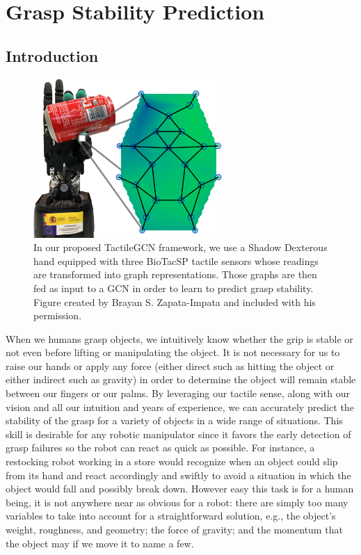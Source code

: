 \chapter{Grasp Stability Prediction}
\label{cha:tactile}

\begin{chapterabstract}
    \lipsum[2]
\end{chapterabstract}

\clearpage

\section{Introduction}
\label{cha:tactile:sec:introduction}

\begin{figure}[!b]
	\centering
	\includegraphics[width = 0.64\textwidth, clip = false, trim = 0 0 0 0]{Figures/Tactile/hand-coke.png}
	\caption{In our proposed TactileGCN framework, we use a Shadow Dexterous hand equipped with three BioTacSP tactile sensors whose readings are transformed into graph representations. Those graphs are then fed as input to a \ac{GCN} in order to learn to predict grasp stability. Figure created by Brayan S. Zapata-Impata and included with his permission.}
	\label{fig:shadow-coke}
\end{figure}

When we humans grasp objects, we intuitively know whether the grip is stable or not even before lifting or manipulating the object. It is not necessary for us to raise our hands or apply any force (either direct such as hitting the object or either indirect such as gravity) in order to determine the object will remain stable between our fingers or our palms. By leveraging our tactile sense, along with our vision and all our intuition and years of experience, we can accurately predict the stability of the grasp for a variety of objects in a wide range of situations. This skill is desirable for any robotic manipulator since it favors the early detection of grasp failures so the robot can react as quick as possible. For instance, a restocking robot working in a store would recognize when an object could slip from its hand and react accordingly and swiftly to avoid a situation in which the object would fall and possibly break down. However easy this task is for a human being, it is not anywhere near as obvious for a robot: there are simply too many variables to take into account for a straightforward solution, e.g., the object's weight, roughness, and geometry; the force of gravity; and the momentum that the object may if we move it to name a few.

